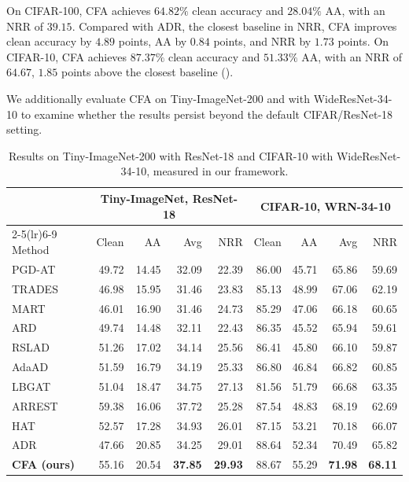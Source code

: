 \documentclass{article} %
\theoremstyle{plain}
\begin{document}
On CIFAR-100, CFA achieves \(64.82\%\) clean accuracy and \(28.04\%\)
AA, with an NRR of \(39.15\). Compared with ADR, the closest baseline
in NRR, CFA improves clean accuracy by \(4.89\) points, AA by \(0.84\)
points, and NRR by \(1.73\) points. On CIFAR-10, CFA achieves
\(87.37\%\) clean accuracy and \(51.33\%\) AA, with an NRR of
\(64.67\), \(1.85\) points above the closest baseline
().

We additionally evaluate CFA on Tiny-ImageNet-200 and with
WideResNet-34-10 to examine whether the results persist beyond the
default CIFAR/ResNet-18 setting.

\begin{table}[!htbp]
  \centering
  \footnotesize
  \setlength{\tabcolsep}{3.2pt}
  \caption{
  Results on Tiny-ImageNet-200 with ResNet-18 and CIFAR-10 with
  WideResNet-34-10, measured in our framework.
  }
  \label{tab:scale}
  \begin{tabular}{lrrrrrrrr}
    \toprule
    & \multicolumn{4}{c}{Tiny-ImageNet, ResNet-18}
      & \multicolumn{4}{c}{CIFAR-10, WRN-34-10} \\
    \cmidrule(lr){2-5}\cmidrule(lr){6-9}
    Method & Clean & AA & Avg & NRR
           & Clean & AA & Avg & NRR \\
    \midrule
    PGD-AT & 49.72 & 14.45 & 32.09 & 22.39
                 & 86.00 & 45.71 & 65.86 & 59.69 \\
    TRADES & 46.98 & 15.95 & 31.46 & 23.83
                 & 85.13 & 48.99 & 67.06 & 62.19 \\
    MART & 46.01 & 16.90 & 31.46 & 24.73
               & 85.29 & 47.06 & 66.18 & 60.65 \\
    \midrule
    ARD & 49.74 & 14.48 & 32.11 & 22.43
               & 86.35 & 45.52 & 65.94 & 59.61 \\
    RSLAD & 51.26 & 17.02 & 34.14 & 25.56
                 & 86.41 & 45.80 & 66.10 & 59.87 \\
    AdaAD & 51.59 & 16.79 & 34.19 & 25.33
                 & 86.80 & 46.84 & 66.82 & 60.85 \\
    LBGAT & 51.04 & 18.47 & 34.75 & 27.13
                 & 81.56 & 51.79 & 66.68 & 63.35 \\
    ARREST & 59.38 & 16.06 & 37.72 & 25.28
                  & 87.54 & 48.83 & 68.19 & 62.69 \\
    HAT & 52.57 & 17.28 & 34.93 & 26.01
               & 87.15 & 53.21 & 70.18 & 66.07 \\
    ADR & 47.66 & 20.85 & 34.25 & 29.01
               & 88.64 & 52.34 & 70.49 & 65.82 \\
    \midrule
    \textbf{CFA (ours)}
      & 55.16 & 20.54 & \textbf{37.85} & \textbf{29.93}
      & 88.67 & 55.29
      & \textbf{71.98} & \textbf{68.11} \\
    \bottomrule
  \end{tabular}
\end{table}
\end{document}
